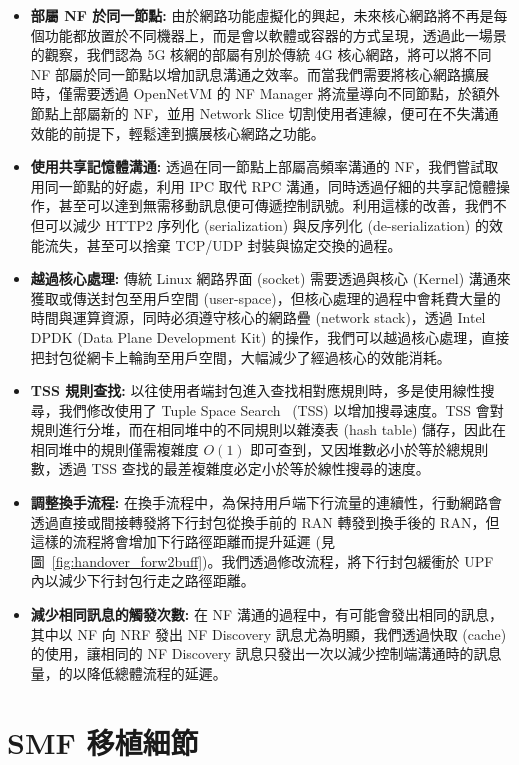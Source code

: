 \begin{itemize}
\item \textbf{部屬 NF 於同一節點:} 由於網路功能虛擬化的興起，未來核心網路將不再是每個功能都放置於不同機器上，而是會以軟體或容器的方式呈現，透過此一場景的觀察，我們認為 5G 核網的部屬有別於傳統 4G 核心網路，將可以將不同 NF 部屬於同一節點以增加訊息溝通之效率。而當我們需要將核心網路擴展時，僅需要透過 OpenNetVM 的 NF Manager 將流量導向不同節點，於額外節點上部屬新的 NF，並用 Network Slice 切割使用者連線，便可在不失溝通效能的前提下，輕鬆達到擴展核心網路之功能。
\item \textbf{使用共享記憶體溝通:} 透過在同一節點上部屬高頻率溝通的 NF，我們嘗試取用同一節點的好處，利用 IPC 取代 RPC 溝通，同時透過仔細的共享記憶體操作，甚至可以達到無需移動訊息便可傳遞控制訊號。利用這樣的改善，我們不但可以減少 HTTP2 序列化 (serialization) 與反序列化 (de-serialization) 的效能流失，甚至可以捨棄 TCP/UDP 封裝與協定交換的過程。
\item \textbf{越過核心處理:} 傳統 Linux 網路界面 (socket) 需要透過與核心 (Kernel) 溝通來獲取或傳送封包至用戶空間 (user-space)，但核心處理的過程中會耗費大量的時間與運算資源，同時必須遵守核心的網路疊 (network stack)，透過 Intel DPDK (Data Plane Development Kit) 的操作，我們可以越過核心處理，直接把封包從網卡上輪詢至用戶空間，大幅減少了經過核心的效能消耗。
\item \textbf{TSS 規則查找:} 以往使用者端封包進入查找相對應規則時，多是使用線性搜尋，我們修改使用了 Tuple Space Search~\cite{paper.TSS} (TSS) 以增加搜尋速度。TSS 會對規則進行分堆，而在相同堆中的不同規則以雜湊表 (hash table) 儲存，因此在相同堆中的規則僅需複雜度 $O(1)$ 即可查到，又因堆數必小於等於總規則數，透過 TSS 查找的最差複雜度必定小於等於線性搜尋的速度。
\item \textbf{調整換手流程:} 在換手流程中，為保持用戶端下行流量的連續性，行動網路會透過直接或間接轉發將下行封包從換手前的 RAN 轉發到換手後的 RAN，但這樣的流程將會增加下行路徑距離而提升延遲 (見圖~\ref{fig:handover_forw2buff})。我們透過修改流程，將下行封包緩衝於 UPF 內以減少下行封包行走之路徑距離。
\item \textbf{減少相同訊息的觸發次數:} 在 NF 溝通的過程中，有可能會發出相同的訊息，其中以 NF 向 NRF 發出 NF Discovery 訊息尤為明顯，我們透過快取 (cache) 的使用，讓相同的 NF Discovery 訊息只發出一次以減少控制端溝通時的訊息量，的以降低總體流程的延遲。
\end{itemize}

\section{SMF 移植細節}
\label{sec:smf_porting}

